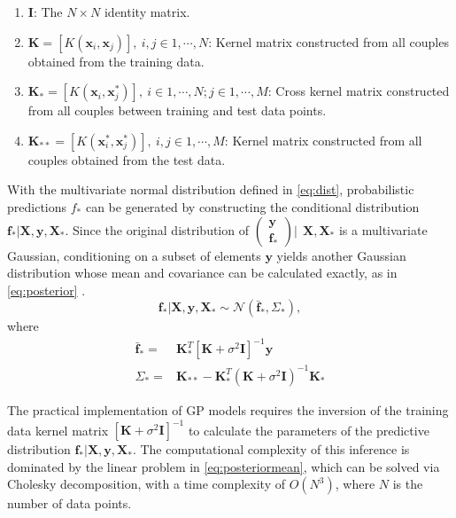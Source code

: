 \begin{enumerate}
      \item $\mathbf{I}$: The $N \times N$ identity matrix.
      \item $\mathbf{K} = [K(\mathbf{x}_i, \mathbf{x}_j)], \ i,j \in 1,\cdots,N$: 
            Kernel matrix constructed from all couples obtained from the training data.
      \item $\mathbf{K}_{*} = [K(\mathbf{x}_i, \mathbf{x}^{*}_j)], \ i \in 1,\cdots,N ; j \in 1,\cdots,M$: 
            Cross kernel matrix constructed from all couples between training and test data points.
      \item $\mathbf{K}_{**} = [K(\mathbf{x}^{*}_i, \mathbf{x}^{*}_j)], \ i,j \in 1,\cdots,M$: 
            Kernel matrix constructed from all couples obtained from the test data.
\end{enumerate}

With the multivariate normal distribution defined in \cref{eq:dist}, probabilistic predictions 
$f_*$ can be generated by constructing the conditional distribution 
$\mathbf{f_*}|\mathbf{X},\mathbf{y},\mathbf{X_*}$. Since the original distribution of 
$\left( \begin{array}{c} \mathbf{y} \\ \mathbf{f_*} \end{array} \right) | \ \ \mathbf{X}, \mathbf{X}_*$ 
is a multivariate Gaussian, conditioning on a subset of elements $\mathbf{y}$ yields another 
Gaussian distribution whose mean and covariance can be calculated exactly, as in 
\cref{eq:posterior} \citep{Rasmussen:2005:GPM:1162254}.
%
\begin{equation}
    \mathbf{f_*}|\mathbf{X},\mathbf{y},\mathbf{X_*} \sim \mathcal{N}(\mathbf{\bar{f}_*}, \Sigma_*)  \label{eq:posterior},
\end{equation}
where
\begin{align}
    \mathbf{\bar{f}_*} = & \mathbf{K}^T_{*} [\mathbf{K} + \sigma^{2} \mathbf{I}]^{-1} \mathbf{y} \label{eq:posteriormean} \\
    \Sigma_* = & \mathbf{K}_{**} - \mathbf{K}^T_{*} \left(\mathbf{K} + \sigma^{2} \mathbf{I}\right)^{-1} \mathbf{K}_{*} \label{eq:posteriorcov}
\end{align}

The practical implementation of GP models requires the inversion of the training data kernel 
matrix $[\mathbf{K} + \sigma^{2} \mathbf{I}]^{-1}$ to calculate the parameters 
of the predictive distribution $\mathbf{f_*}|\mathbf{X},\mathbf{y},\mathbf{X_*}$. The computational 
complexity of this inference is dominated by the linear problem in \cref{eq:posteriormean}, which 
can be solved via Cholesky decomposition, with a time complexity of $O(N^3)$, where $N$ is the 
number of data points.

